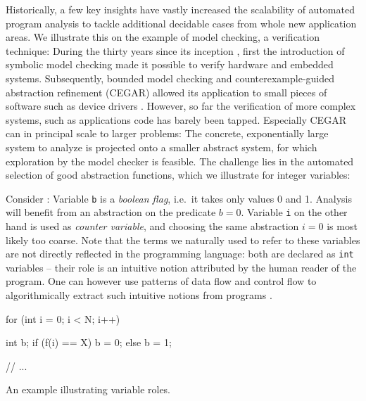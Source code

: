 Historically, a few key insights have vastly increased the scalability of automated program analysis to tackle additional decidable cases from whole new application areas. We illustrate this on the example of model checking, a verification technique: During the thirty years since its inception \cite{DBLP:conf/popl/ClarkeES83,DBLP:conf/programm/QueilleS82}, first the introduction of symbolic model checking \cite{DBLP:conf/lics/BurchCMDH90} made it possible to verify hardware and embedded systems. Subsequently, bounded model checking \cite{DBLP:journals/fmsd/ClarkeBRZ01} and counterexample-guided abstraction refinement (CEGAR) \cite{DBLP:conf/cav/ClarkeGJLV00} allowed its application to small pieces of software such as device drivers \cite{DBLP:conf/eurosys/BallBCLLMORU06}. However, so far the verification of more complex systems, such as applications code has barely been tapped. Especially CEGAR can in principal scale to larger problems: The concrete, exponentially large system to analyze is projected onto a smaller abstract system, for which exploration by the model checker is feasible. The challenge lies in the automated selection of good abstraction functions, which we illustrate for integer variables:

Consider : Variable \texttt{b} is a \emph{boolean flag}, i.e.\ it takes only values 0 and 1. Analysis will benefit from an abstraction on the predicate $b = 0$. Variable \texttt{i} on the other hand is used as \emph{counter variable}, and choosing the same abstraction $i = 0$ is most likely too coarse. Note that the terms we naturally used to refer to these variables are not directly reflected in the programming language: both are declared as \texttt{int} variables -- their role is an intuitive notion attributed by the human reader of the program. One can however use patterns of data flow and control flow to algorithmically extract such intuitive notions from programs \cite{DBLP:journals/corr/abs-1305-6745}.

\begin{listing}
    \begin{ccode}
for (int i = 0; i < N; i++) {

    int b;
    if (f(i) == X) {
        b = 0;
    } else {
        b = 1;
    }

    // ...
}
    \end{ccode}
    \caption{An example illustrating variable roles.}
    \label{lst:varroles}
\end{listing}

